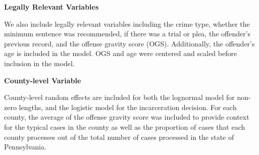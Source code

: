 \documentclass[
  letterpaper,
  DIV=11,
  numbers=noendperiod]{scrartcl}
\begin{document}
\textbf{Legally Relevant Variables}

We also include legally relevant variables including the crime type,
whether the minimum sentence was recommended, if there was a trial or
plea, the offender's previous record, and the offense gravity score
(OGS). Additionally, the offender's age is included in the model. OGS
and age were centered and scaled before inclusion in the model.

\textbf{County-level Variable}

County-level random effects are included for both the lognormal model
for non-zero lengths, and the logistic model for the incarceration
decision. For each county, the average of the offense gravity score was
included to provide context for the typical cases in the county as well
as the proportion of cases that each county processes out of the total
number of cases processed in the state of Pennsylvania.
\end{document}
